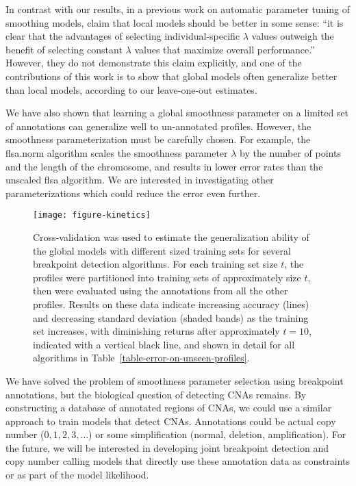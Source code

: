 \documentclass{bioinfo}
\begin{document}
In contrast with our results, in a previous work on
automatic parameter tuning of smoothing models, \cite{penalized-cna}
claim that local models should be better in some sense: ``it is clear
that the advantages of selecting individual-specific $\lambda$ values
outweigh the benefit of selecting constant $\lambda$ values that
maximize overall performance.''  However, they do not demonstrate this
claim explicitly, and one of the contributions of this work is to show
that global models often generalize better than local models,
according to our leave-one-out estimates. 



We have also shown that learning a global smoothness parameter on a
limited set of annotations can generalize well to un-annotated
profiles. However, the smoothness parameterization must be carefully
chosen. For example, the flsa.norm algorithm scales the smoothness
parameter $\lambda$ by the number of points and the length of the
chromosome, and results in lower error rates than the unscaled flsa
algorithm. We are interested in investigating other parameterizations
which could reduce the error even further.



\begin{figure}[b]
  \centering
  \texttt{[image: figure-kinetics]}
  \caption{\label{figure-kinetics} Cross-validation was used to
    estimate the generalization ability of the global models with
    different sized training sets for several breakpoint detection
    algorithms. For each training set size $t$, the profiles were
    partitioned into training sets of approximately size $t$, then
    were evaluated using the annotations from all the other
    profiles. Results on these data indicate increasing accuracy (lines)
    and decreasing standard deviation (shaded bands) as the training set
    increases, with diminishing returns after approximately $t=10$,
    indicated with a vertical black line, and shown in detail for all
    algorithms in Table~\ref{table-error-on-unseen-profiles}. }
\end{figure}




We have solved the problem of smoothness parameter selection using
breakpoint annotations, but the biological question of detecting CNAs
remains. By constructing a database of annotated regions of CNAs, we
could use a similar approach to train models that detect
CNAs. Annotations could be actual copy number ($0,1,2,3,\dots$) or
some simplification (normal, deletion, amplification). For the future,
we will be interested in developing joint breakpoint detection and
copy number calling models that directly use these annotation data as
constraints or as part of the model likelihood.
\end{document}

